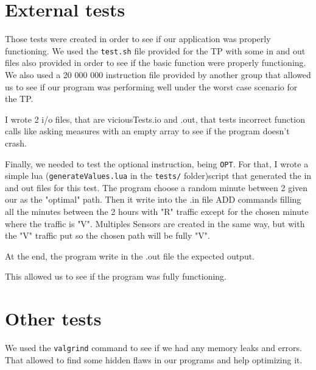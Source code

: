 \documentclass[10pt]{article}
\begin{document}
\section{External tests}
Those tests were created in order to see if our application was properly functioning. We used the \texttt{test.sh} file provided for the TP with some in and out files also provided in order to see if the basic function were properly functioning. We also used a 20 000 000 instruction file provided by another group that allowed us to see if our program was performing well under the worst case scenario for the TP.

I wrote 2 i/o files, that are viciousTests.io and .out, that tests incorrect function calls like asking measures with an empty array to see if the program doesn't crash.

Finally, we needed to test the optional instruction, being \texttt{OPT}. For that, I wrote a simple lua (\texttt{generateValues.lua} in the \texttt{tests/} folder)script that generated the in and out files for this test. The program choose a random minute between 2 given our as the "optimal" path. Then it write into the .in file ADD commands filling all the minutes between the 2 hours with "R" traffic except for the chosen minute where the traffic is "V". Multiples Sensors are created in the same way, but with the "V" traffic put so the chosen path will be fully "V".

At the end, the program write in the .out file the expected output.

This allowed us to see if the program was fully functioning.

\section{Other tests}
We used the {\tt valgrind} command to see if we had any memory leaks and errors. That allowed to find some hidden flaws in our programs and help optimizing it.
\end{document}
